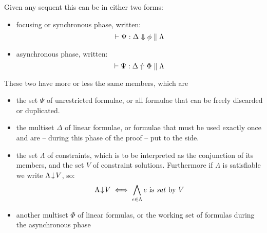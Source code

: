 \documentclass[a4paper, 12pt, tesi, english]{report}
\begin{document}
\begin{define}
	Given any sequent this can be in either two forms:
	\begin{itemize}
		\item focusing or synchronous phase, written:
			$$\vdash \Psi : \Delta \Downarrow \phi \;\Vert\; \Lambda$$
		\item asynchronous phase, written:
			$$\vdash \Psi : \Delta \Uparrow \Phi \;\Vert\; \Lambda$$
	\end{itemize}
	These two have more or less the same members, which are
	\begin{itemize}
		\item the set $\Psi$ of unrestricted formulae, or all formulae that can be freely discarded or duplicated.
		\item the multiset $\Delta$ of linear formulae, or formulae that must be used exactly once and are -- during this phase of the proof -- put to the side.
		\item the set $\Lambda$ of constraints, which is to be interpreted as the conjunction of its members, and the set $V$ of constraint solutions.
			Furthermore if $\Lambda$ is satisfiable we write $\Lambda\!\downarrow\!V$, so:
				$$ \Lambda\!\downarrow\!V \;\Longleftrightarrow\; \bigwedge_{e \in \Lambda} e \text{ is \textit{sat} by } V $$
		\item another multiset $\Phi$ of linear formulas, or the working set of formulas during the asynchronous phase
	\end{itemize}
\end{define}
\end{document}
